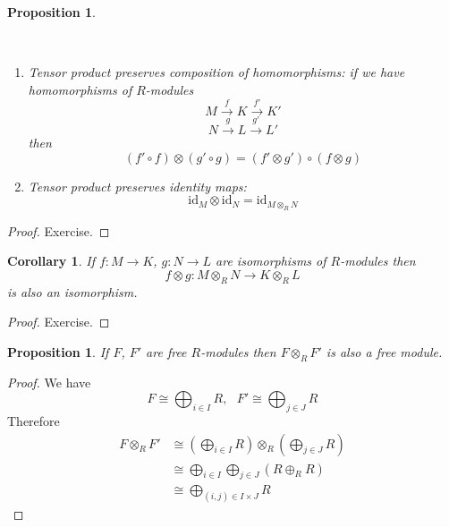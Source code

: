 \documentclass[12pt, letterpaper, oneside]{article}
\theoremstyle{plain}
\newtheorem{proposition}[theorem]{Proposition}
\newtheorem{corollary}[theorem]{Corollary}
\theoremstyle{definition}
\newcommand{\lra}{\longrightarrow}
\newcommand{\id}{\mathrm{id}}
\newcommand{\benu}{\begin{enumerate}}
\newcommand{\eenu}{\end{enumerate}}
\newcommand{\vs}{\vskip 5mm}
\newcommand{\isep}[1][0]{\setlength{\itemsep}{#1 mm}}
\begin{document}
\vs\vs

\begin{proposition}\ 

\vskip -13mm

\ 
\benu
\isep[5]
\item Tensor product preserves composition of homomorphisms: if we have homomorphisms 
of $R$-modules
$$M\overset{f}{\lra} K \overset{f'}{\lra} K'$$
$$N \overset{g}{\lra} L \overset{g'}{\lra} L'$$
then 
$$(f'\circ f)\otimes (g'\circ g) = (f'\otimes g')\circ (f\otimes g)$$


\item Tensor product preserves identity maps:
$$\id_{M}\otimes \id_{N} = \id_{M\otimes_{R}N}$$

\eenu

\end{proposition}

\vs

\begin{proof}
Exercise.
\end{proof}




\vs\vs


\begin{corollary}
If $f\colon M\to K$, $g\colon N \to L$ are isomorphisms of $R$-modules then 
$$f\otimes g \colon M\otimes_{R}N \to K\otimes_{R}L$$
is also an isomorphism.
\end{corollary}


\vs 

\begin{proof}
Exercise.
\end{proof}


\vs\vs

\begin{proposition}
If $F$, $F'$ are free $R$-modules then $F\otimes_{R} F'$ is also a free module. 
\end{proposition}


\vs

\begin{proof}
We have 
$$F\cong \bigoplus_{i\in I} R, \ \ \ F'\cong \bigoplus_{j\in J} R$$
Therefore 
\begin{align*}
F \otimes_{R} F' & \cong ( \bigoplus_{i\in I} R)\otimes_{R}(\bigoplus_{j\in J} R) \\
& \cong  \bigoplus_{i\in I}  \bigoplus_{j\in J} (R\oplus_{R} R) \\
&  \cong \bigoplus_{(i,j)\in I\times J} R
\end{align*}
\end{proof}
\end{document}
